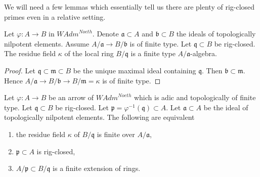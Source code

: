 \noindent
We will need a few lemmas which essentially tell us there are
plenty of rig-closed primes even in a relative setting.

\begin{lemma}
\label{lemma-rig-closed-point-relative-residue-field}
Let $\varphi : A \to B$ in $\textit{WAdm}^{Noeth}$.
Denote $\mathfrak a \subset A$ and $\mathfrak b \subset B$
the ideals of topologically nilpotent elements. Assume
$A/\mathfrak a \to B/\mathfrak b$ is of finite type.
Let $\mathfrak q \subset B$ be rig-closed.
The residue field $\kappa$ of the local ring $B/\mathfrak q$
is a finite type $A/\mathfrak a$-algebra.
\end{lemma}

\begin{proof}
Let $\mathfrak q \subset \mathfrak m \subset B$ be the unique
maximal ideal containing $\mathfrak q$.
Then $\mathfrak b \subset \mathfrak m$. Hence
$A/\mathfrak a \to B/\mathfrak b \to B/\mathfrak m = \kappa$ is
of finite type.
\end{proof}

\begin{lemma}
\label{lemma-rig-closed-point-relative}
Let $\varphi : A \to B$ be an arrow of $\textit{WAdm}^{Noeth}$
which is adic and topologically of finite type.
Let $\mathfrak q \subset B$ be rig-closed.
Let $\mathfrak p = \varphi^{-1}(\mathfrak q) \subset A$.
Let $\mathfrak a \subset A$ be the ideal of topologically nilpotent
elements.
The following are equivalent
\begin{enumerate}
\item the residue field $\kappa$ of $B/\mathfrak q$ is finite
over $A/\mathfrak a$,
\item $\mathfrak p \subset A$ is rig-closed,
\item $A/\mathfrak p \subset B/\mathfrak q$ is a finite extension
of rings.
\end{enumerate}
\end{lemma}

